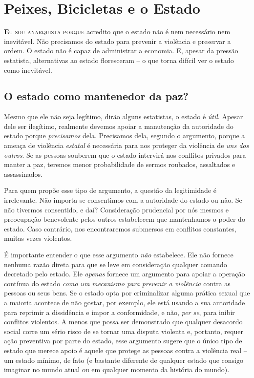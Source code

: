 
\chapter{Peixes, Bicicletas e o Estado}
\label{chap:2}

\lettrine[lines=2]{\textcolor{LettrineColor}{\textbf{E}}}{u sou anarquista porque} acredito que o estado não é nem necessário nem inevitável. Não precisamos do estado para prevenir a violência e preservar a ordem. O estado não é capaz de administrar a economia. E, apesar da pressão estatista, alternativas ao estado floresceram -- o que torna difícil ver o estado como inevitável.

\section{O estado como mantenedor da paz?}

Mesmo que ele não seja legítimo, dirão alguns estatistas, o estado é \emph{útil}. Apesar dele ser ilegítimo, realmente devemos apoiar a manutenção da autoridade do estado porque \emph{precisamos} dela. Precisamos dela, segundo o argumento, porque a ameaça de violência \emph{estatal} é necessária para nos proteger da violência de \emph{uns dos outros}. Se as pessoas souberem que o estado intervirá nos conflitos privados para manter a paz, teremos menor probabilidade de sermos roubados, assaltados e assassinados.

Para quem propõe esse tipo de argumento, a questão da legitimidade é irrelevante. Não importa se consentimos com a autoridade do estado ou não. Se não tivermos consentido, e daí? Consideração prudencial por nós mesmos e preocupação benevolente pelos outros estabelecem que mantenhamos o poder do estado. Caso contrário, nos encontraremos submersos em conflitos constantes, muitas vezes violentos.

É importante entender o que esse argumento \emph{não} estabelece. Ele não fornece nenhuma razão direta para que se leve em consideração qualquer comando decretado pelo estado. Ele \emph{apenas} fornece um argumento para apoiar a operação contínua do estado \emph{como um mecanismo para prevenir a violência} contra as pessoas ou seus bens. Se o estado opta por criminalizar alguma prática sexual que a maioria acontece de não gostar, por exemplo, ele está usando a sua autoridade para reprimir a dissidência e impor a conformidade, e não, \emph{per se}, para inibir conflitos violentos. A menos que possa ser demonstrado que qualquer desacordo social corre um sério risco de se tornar uma disputa violenta e, portanto, requer ação preventiva por parte do estado, esse argumento sugere que o único tipo de estado que merece apoio é aquele que protege as pessoas contra a violência real -- um estado mínimo, de fato (e bastante diferente de qualquer estado que consigo imaginar no mundo atual ou em qualquer momento da história do mundo).

